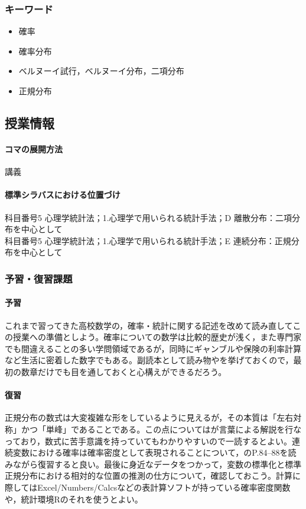 \subsubsection{キーワード}
\begin{itemize}
	\item 確率
	\item 確率分布
	\item ベルヌーイ試行，ベルヌーイ分布，二項分布
	\item 正規分布
\end{itemize}
\subsection{授業情報}
\paragraph{コマの展開方法}
講義
\paragraph{標準シラバスにおける位置づけ}
科目番号5 心理学統計法；1.心理学で用いられる統計手法；D 離散分布：二項分布を中心として\\
科目番号5 心理学統計法；1.心理学で用いられる統計手法；E 連続分布：正規分布を中心として

\subsubsection{予習・復習課題}
\paragraph{予習}
これまで習ってきた高校数学の，確率・統計に関する記述を改めて読み直してこの授業への準備としよう。確率についての数学は比較的歴史が浅く，また専門家でも間違えることの多い学問領域であるが，同時にギャンブルや保険の利率計算など生活に密着した数字でもある。副読本として読み物\citet{Hamada201812}や\citet{Maeda2017}を挙げておくので，最初の数章だけでも目を通しておくと心構えができるだろう。
\paragraph{復習}
正規分布の数式は大変複雑な形をしているように見えるが，その本質は「左右対称」かつ「単峰」であることである。この点については\citet{Naganuma2201611}が言葉による解説を行なっており，数式に苦手意識を持っていてもわかりやすいので一読するとよい。連続変数における確率は確率密度として表現されることについて，\citet{Maeda2017}のP.84--88を読みながら復習すると良い。最後に身近なデータをつかって，変数の標準化と標準正規分布における相対的な位置の推測の仕方について，確認しておこう。計算に際してはExcel/Numbers/Calcsなどの表計算ソフトが持っている確率密度関数や，統計環境Rのそれを使うとよい。